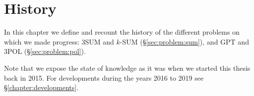 \chapter{History}

In this chapter we define and recount the history of the different problems on
which we made progress:
%
3SUM and \(k\)-SUM (\S\ref{sec:problem:sum}),
and
GPT and 3POL (\S\ref{sec:problem:pol}).

Note that we expose the state of knowledge as it was when we started this
thesis back in 2015. For developments during the years 2016 to 2019 see
\S\ref{chapter:developments}.



